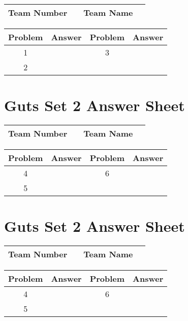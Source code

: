\documentclass[14pt]{article}
\begin{document}
\begin{center}
\begin{tabular}{|r|r|r|r|}
\hline
	Team Number & \hspace{10em} &
	Team Name & \hspace{15em} \\ \hline
\end{tabular}
\end{center}
\begin{tabularx}{\textwidth}{|c|l|c|X|}\hline
	Problem & Answer & Problem & Answer \\\hline
	1 & \hspace{15em} & 3 & \\\hline
	2 & & & \\\hline
\end{tabularx}

\section*{Guts Set 2 Answer Sheet}

\begin{center}
\begin{tabular}{|r|r|r|r|}
\hline
	Team Number & \hspace{10em} &
	Team Name & \hspace{15em} \\ \hline
\end{tabular}
\end{center}
\begin{tabularx}{\textwidth}{|c|l|c|X|}\hline
	Problem & Answer & Problem & Answer \\\hline
	4 & \hspace{15em} & 6 & \\\hline
	5 & & & \\\hline
\end{tabularx}

\vspace{30px}

\section*{Guts Set 2 Answer Sheet}

\begin{center}
\begin{tabular}{|r|r|r|r|}
\hline
	Team Number & \hspace{10em} &
	Team Name & \hspace{15em} \\ \hline
\end{tabular}
\end{center}
\begin{tabularx}{\textwidth}{|c|l|c|X|}\hline
	Problem & Answer & Problem & Answer \\\hline
	4 & \hspace{15em} & 6 & \\\hline
	5 & & & \\\hline
\end{tabularx}
\end{document}
